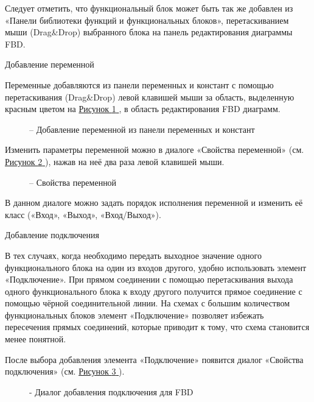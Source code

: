 \documentclass[letterpaper,10pt,russian]{sphinxmanual}
\begin{document}
Следует отметить, что функциональный блок может быть так же добавлен из
«Панели библиотеки функций и функциональных блоков»,
перетаскиванием мыши (Drag\&Drop) выбранного блока на панель
редактирования диаграммы FBD.

Добавление переменной

Переменные добавляются из панели переменных и констант с помощью
перетаскивания (Drag\&Drop) левой клавишей мыши за область, выделенную
красным цветом на \hyperref[usage_guide/ide_components:image62]{Рисунок \ref{usage_guide/ide_components:image62} }, в область редактирования FBD диаграмм.
\begin{figure}[htbp]
\centering
\capstart

\noindent{}
\caption{– Добавление переменной из панели переменных и констант}\label{usage_guide/ide_components:image62}\end{figure}

Изменить параметры переменной можно в диалоге «Свойства переменной» (см.
\hyperref[usage_guide/ide_components:image63]{Рисунок \ref{usage_guide/ide_components:image63} }), нажав на неё два раза левой клавишей мыши.
\begin{figure}[htbp]
\centering
\capstart

\noindent{}
\caption{– Свойства переменной}\label{usage_guide/ide_components:image63}\end{figure}

В данном диалоге можно задать порядок исполнения переменной и изменить
её класс («Вход», «Выход», «Вход/Выход»).

Добавление подключения

В тех случаях, когда необходимо передать выходное значение одного
функционального блока на один из входов другого, удобно использовать
элемент «Подключение». При прямом соединении с помощью перетаскивания
выхода одного функционального блока к входу другого получится прямое
соединение с помощью чёрной соединительной линии. На схемах с большим
количеством функциональных блоков элемент «Подключение» позволяет
избежать пересечения прямых соединений, которые приводит к тому, что
схема становится менее понятной.

После выбора добавления элемента «Подключение» появится диалог «Свойства
подключения» (см. \hyperref[usage_guide/ide_components:image64]{Рисунок \ref{usage_guide/ide_components:image64} }).
\begin{figure}[htbp]
\centering
\capstart

\noindent{}
\caption{- Диалог добавления подключения для FBD}\label{usage_guide/ide_components:image64}\end{figure}
\end{document}
